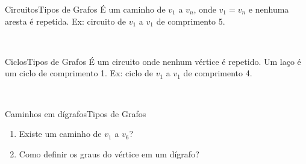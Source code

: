 \documentclass[t]{beamer}
\begin{document}

\begin{ftst}{Circuitos}{Tipos de Grafos}
É um caminho de $v_1$ a $v_n$, onde $v_1 = v_n$ e nenhuma aresta é repetida.
\vone
Ex: circuito de $v_1$ a $v_1$ de comprimento 5.

\vone
\centering
\\


\end{ftst}


\begin{ftst}{Ciclos}{Tipos de Grafos}
É um circuito onde nenhum vértice é repetido.
\vone
Um laço é um ciclo de comprimento 1.
\vone
Ex: ciclo de $v_1$ a $v_1$ de comprimento 4.

\vone
\centering
\\


\end{ftst}


\begin{ftst}{Caminhos em dígrafos}{Tipos de Grafos}
\begin{enumerate}
    \item Existe um caminho de $v_1$ a $v_6$?
    \item Como definir os graus do vértice em um dígrafo?
\end{enumerate}

\vone
\centering
\\


\end{ftst}


\end{document}
